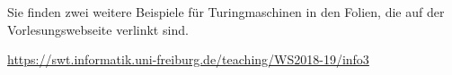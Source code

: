 
{
\color{red}
Sie finden zwei weitere Beispiele für Turingmaschinen in den Folien, die auf der Vorlesungswebseite verlinkt sind.

\url{https://swt.informatik.uni-freiburg.de/teaching/WS2018-19/info3}
}


